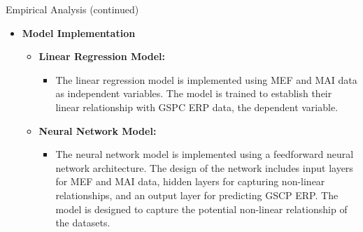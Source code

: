 \documentclass{beamer}
\begin{document}
\begin{frame}{Empirical Analysis (continued)}
  \begin{itemize}    
    \item \textbf{Model Implementation}
      \begin{itemize}
        \item \textbf{Linear Regression Model:}
          \begin{itemize}
            \item The linear regression model is implemented using MEF and MAI data as independent variables. The model is trained to establish their linear relationship with GSPC ERP data, the dependent variable.
          \end{itemize}
        \item \textbf{Neural Network Model:}
          \begin{itemize}
            \item The neural network model is implemented using a feedforward neural network architecture. The design of the network includes input layers for MEF and MAI data, hidden layers for capturing non-linear relationships, and an output layer for predicting GSCP ERP. The model is designed to capture the potential non-linear relationship of the datasets.
          \end{itemize}
      \end{itemize}
  \end{itemize}
\end{frame}
\end{document}
